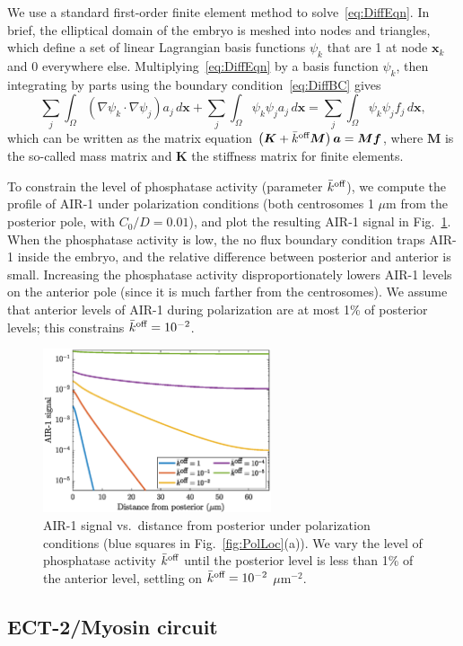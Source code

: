 \documentclass[11pt]{article}
\newcommand{\V}[1]{\boldsymbol{#1}}                 %
\newcommand{\M}[1]{\boldsymbol{#1}}
\begin{document}
\begin{appendix}
We use a standard first-order finite element method to solve\ \eqref{eq:DiffEqn}. In brief, the elliptical domain of the embryo is meshed into nodes and triangles, which define a set of linear Lagrangian basis functions $\psi_k$ that are 1 at node $\V{x}_k$ and 0 everywhere else. Multiplying\ \eqref{eq:DiffEqn} by a basis function $\psi_k$, then integrating by parts using the boundary condition\ \eqref{eq:DiffBC} gives 
\begin{equation}
\sum_j \int_{\Omega} \left(\nabla \psi_k \cdot \nabla \psi_j\right) a_j \, d\V{x}+\sum_j \int_{\Omega} \psi_k \psi_j a_j \, d\V{x}= \sum_j \int_{\Omega} \psi_k \psi_j f_j \, d\V{x},
\end{equation}
which can be written as the matrix equation $\left(\M K + \koffb \M M \right) \V a = \M M \V f$, where $\M{M}$ is the so-called mass matrix and $\M{K}$ the stiffness matrix for finite elements. 

To constrain the level of phosphatase activity (parameter $\bar{k}^\text{off}$), we compute the profile of AIR-1 under polarization conditions (both centrosomes 1 $\mu$m from the posterior pole, with $C_0/D=0.01$), and plot the resulting AIR-1 signal in Fig.\ \ref{fig:AIR1ProfKoff}. When the phosphatase activity is low, the no flux boundary condition traps AIR-1 inside the embryo, and the relative difference between posterior and anterior is small. Increasing the phosphatase activity disproportionately lowers AIR-1 levels on the anterior pole (since it is much farther from the centrosomes). We assume that anterior levels of AIR-1 during polarization are at most 1\% of posterior levels; this constrains $\bar{k}^\text{off}=10^{-2}$. 

\begin{figure}
\centering
\includegraphics[width=0.6\textwidth]{Glotzer/PolarizationKoffAir.eps}
\caption{\label{fig:AIR1ProfKoff}AIR-1 signal vs.\ distance from posterior under polarization conditions (blue squares in Fig.\ \ref{fig:PolLoc}(a)). We vary the level of phosphatase activity $\bar{k}^\text{off}$ until the posterior level is less than 1\% of the anterior level, settling on $\bar{k}^\text{off}=10^{-2}$ $\mu$m$^{-2}$.}
\end{figure}

\subsection{ECT-2/Myosin circuit}

\end{appendix}




\end{document}
